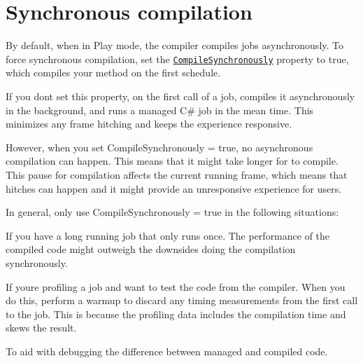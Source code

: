 \chapter{Synchronous compilation}
\hypertarget{md__hey_tea_9_2_library_2_package_cache_2com_8unity_8burst_0d1_88_87_2_documentation_0i_2compilation-synchronous}{}\label{md__hey_tea_9_2_library_2_package_cache_2com_8unity_8burst_0d1_88_87_2_documentation_0i_2compilation-synchronous}
\label{md__hey_tea_9_2_library_2_package_cache_2com_8unity_8burst_0d1_88_87_2_documentation_0i_2compilation-synchronous_autotoc_md307}%
%
 By default, when in Play mode, the  compiler compiles jobs asynchronously. To force synchronous compilation, set the \href{xref:Unity.Burst.BurstCompileAttribute.CompileSynchronously}{\texttt{ {\ttfamily Compile\+Synchronously}}} property to {\ttfamily true}, which compiles your method on the first schedule.


\begin{DoxyCode}{0}
\DoxyCodeLine{\textcolor{preprocessor}{\ \#}}
\DoxyCodeLine{[BurstCompile(CompileSynchronously\ =\ \textcolor{keyword}{true})]}
\DoxyCodeLine{\{}
\DoxyCodeLine{\ \ \ \ \textcolor{comment}{//\ ...}}
\DoxyCodeLine{\}}

\end{DoxyCode}


If you don\textquotesingle{}t set this property, on the first call of a job,  compiles it asynchronously in the background, and runs a managed C\# job in the mean time. This minimizes any frame hitching and keeps the experience responsive.

However, when you set {\ttfamily Compile\+Synchronously = true}, no asynchronous compilation can happen. This means that it might take longer for  to compile. This pause for compilation affects the current running frame, which means that hitches can happen and it might provide an unresponsive experience for users.

In general, only use {\ttfamily Compile\+Synchronously = true} in the following situations\+:


\begin{DoxyItemize}
\item If you have a long running job that only runs once. The performance of the compiled code might outweigh the downsides doing the compilation synchronously.
\item If you\textquotesingle{}re profiling a  job and want to test the code from the  compiler. When you do this, perform a warmup to discard any timing measurements from the first call to the job. This is because the profiling data includes the compilation time and skews the result.
\item To aid with debugging the difference between managed and  compiled code. 
\end{DoxyItemize}